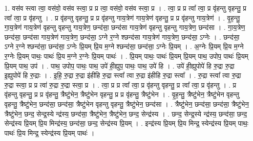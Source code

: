 \documentclass[17pt]{extarticle}
\begin{document}
1. वस॑व स्त्वा त्वा॒ वस॑वो॒ वस॑व स्त्वा॒ प्र प्र त्वा॒ वस॑वो॒ वस॑व स्त्वा॒ प्र । . त्वा॒ प्र प्र त्वा᳚ त्वा॒ प्र वृ॑हन्तु वृहन्तु॒ प्र त्वा᳚ त्वा॒ प्र वृ॑हन्तु । . प्र वृ॑हन्तु वृहन्तु॒ प्र प्र वृ॑हन्तु गाय॒त्रेण॑ गाय॒त्रेण॑ वृहन्तु॒ प्र प्र वृ॑हन्तु गाय॒त्रेण॑ । . वृ॒ह॒न्तु॒ गा॒य॒त्रेण॑ गाय॒त्रेण॑ वृहन्तु वृहन्तु गाय॒त्रेण॒ छन्द॑सा॒ छन्द॑सा गाय॒त्रेण॑ वृहन्तु वृहन्तु गाय॒त्रेण॒ छन्द॑सा । . गा॒य॒त्रेण॒ छन्द॑सा॒ छन्द॑सा गाय॒त्रेण॑ गाय॒त्रेण॒ छन्द॑सा॒ ऽग्ने र॒ग्ने श्छन्द॑सा गाय॒त्रेण॑ गाय॒त्रेण॒ छन्द॑सा॒ ऽग्नेः । . छन्द॑सा॒ ऽग्ने र॒ग्ने श्छन्द॑सा॒ छन्द॑सा॒ ऽग्नेः प्रि॒यम् प्रि॒य म॒ग्ने श्छन्द॑सा॒ छन्द॑सा॒ ऽग्नेः प्रि॒यम् । . अ॒ग्नेः प्रि॒यम् प्रि॒य म॒ग्ने र॒ग्नेः प्रि॒यम् पाथः॒ पाथः॑ प्रि॒य म॒ग्ने र॒ग्नेः प्रि॒यम् पाथः॑ । . प्रि॒यम् पाथः॒ पाथः॑ प्रि॒यम् प्रि॒यम् पाथ॒ उपोप॒ पाथः॑ प्रि॒यम् प्रि॒यम् पाथ॒ उप॑ । . पाथ॒ उपोप॒ पाथः॒ पाथ॒ उपे॑ ही॒ह्युप॒ पाथः॒ पाथ॒ उपे॑ हि । . उपे॑ ही॒ह्युपोपे॑ हि रु॒द्रा रु॒द्रा इ॒ह्युपोपे॑ हि रु॒द्राः । . इ॒हि॒ रु॒द्रा रु॒द्रा इ॑हीहि रु॒द्रा स्त्वा᳚ त्वा रु॒द्रा इ॑हीहि रु॒द्रा स्त्वा᳚ । . रु॒द्रा स्त्वा᳚ त्वा रु॒द्रा रु॒द्रा स्त्वा॒ प्र प्र त्वा॑ रु॒द्रा रु॒द्रा स्त्वा॒ प्र । . त्वा॒ प्र प्र त्वा᳚ त्वा॒ प्र वृ॑हन्तु वृहन्तु॒ प्र त्वा᳚ त्वा॒ प्र वृ॑हन्तु । . प्र वृ॑हन्तु वृहन्तु॒ प्र प्र वृ॑हन्तु॒ त्रैष्टु॑भेन॒ त्रैष्टु॑भेन वृहन्तु॒ प्र प्र वृ॑हन्तु॒ त्रैष्टु॑भेन । . वृ॒ह॒न्तु॒ त्रैष्टु॑भेन॒ त्रैष्टु॑भेन वृहन्तु वृहन्तु॒ त्रैष्टु॑भेन॒ छन्द॑सा॒ छन्द॑सा॒ त्रैष्टु॑भेन वृहन्तु वृहन्तु॒ त्रैष्टु॑भेन॒ छन्द॑सा । . त्रैष्टु॑भेन॒ छन्द॑सा॒ छन्द॑सा॒ त्रैष्टु॑भेन॒ त्रैष्टु॑भेन॒ छन्द॒ सेन्द्र॒स्ये न्द्र॑स्य॒ छन्द॑सा॒ त्रैष्टु॑भेन॒ त्रैष्टु॑भेन॒ छन्द॒ सेन्द्र॑स्य । . छन्द॒ सेन्द्र॒स्ये न्द्र॑स्य॒ छन्द॑सा॒ छन्द॒ सेन्द्र॑स्य प्रि॒यम् प्रि॒य मिन्द्र॑स्य॒ छन्द॑सा॒ छन्द॒ सेन्द्र॑स्य प्रि॒यम् । . इन्द्र॑स्य प्रि॒यम् प्रि॒य मिन्द्र॒ स्येन्द्र॑स्य प्रि॒यम् पाथः॒ पाथः॑ प्रि॒य मिन्द्र॒ स्येन्द्र॑स्य प्रि॒यम् पाथः॑ । \newline
\end{document}
